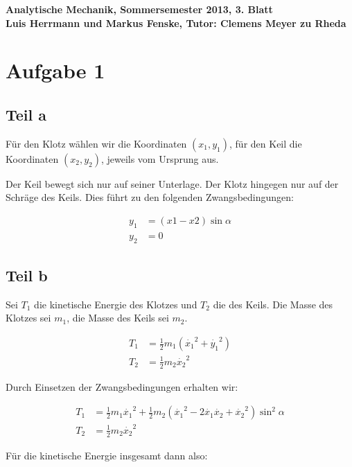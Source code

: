 \documentclass[a4paper,german,12pt,smallheadings]{scrartcl}
\begin{document}
\begin{center}
\bfseries %
\sffamily %
\vspace{-40pt}
Analytische Mechanik, Sommersemester 2013, 3. Blatt \\
Luis Herrmann und Markus Fenske, Tutor: Clemens Meyer zu Rheda
\vspace{-10pt}
\end{center}
\section*{Aufgabe 1}

\subsection*{Teil a}
Für den Klotz wählen wir die Koordinaten $(x_1, y_1)$, für den Keil die
Koordinaten $(x_2, y_2)$, jeweils vom Ursprung aus.

Der Keil bewegt sich nur auf seiner Unterlage. Der Klotz hingegen nur auf der
Schräge des Keils. Dies führt zu den folgenden Zwangsbedingungen:


\begin{align*}
  y_1 &= (x1-x2) \sin \alpha \\
  y_2 &= 0
\end{align*}

\subsection*{Teil b}

Sei $T_1$ die kinetische Energie des Klotzes und $T_2$ die des Keils. Die Masse
des Klotzes sei $m_1$, die Masse des Keils sei $m_2$.

\begin{align*}
  T_1 &= \frac{1}{2} m_1 \left(\dot{x_1}^2 + \dot{y_1}^2\right) \\
  T_2 &= \frac{1}{2} m_2 \dot{x_2}^2
\end{align*}

Durch Einsetzen der Zwangsbedingungen erhalten wir:

\begin{align*}
  T_1 &= \frac{1}{2}m_1\dot{x_1}^2 + \frac{1}{2}m_2 (\dot{x_1}^2 - 2\dot{x_1}\dot{x_2}+\dot{x_2}^2) \sin^2 \alpha \\
  T_2 &= \frac{1}{2} m_2 \dot{x_2}^2
\end{align*}

Für die kinetische Energie insgesamt dann also:
\end{document}
